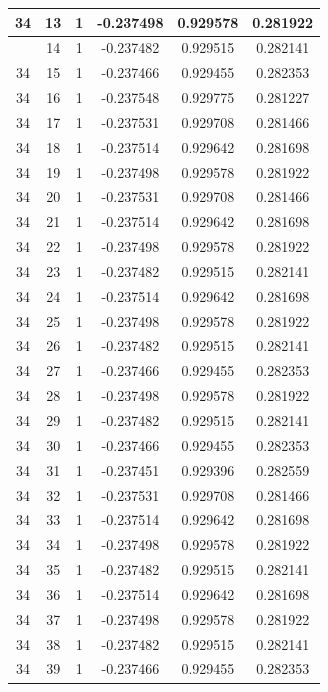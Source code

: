 \documentclass[12pt,a4paper]{article}
\numberwithin{equation}{section}
\numberwithin{figure}{section}
\numberwithin{table}{section}
\begin{document}
\begin{longtable}{|c|c|c|c|c|c|}
34 & 13 & 1 & -0.237498 & 0.929578 & 0.281922 \\ \hline
\pagebreak
34 & 14 & 1 & -0.237482 & 0.929515 & 0.282141 \\ \hline
34 & 15 & 1 & -0.237466 & 0.929455 & 0.282353 \\ \hline
34 & 16 & 1 & -0.237548 & 0.929775 & 0.281227 \\ \hline
34 & 17 & 1 & -0.237531 & 0.929708 & 0.281466 \\ \hline
34 & 18 & 1 & -0.237514 & 0.929642 & 0.281698 \\ \hline
34 & 19 & 1 & -0.237498 & 0.929578 & 0.281922 \\ \hline
34 & 20 & 1 & -0.237531 & 0.929708 & 0.281466 \\ \hline
34 & 21 & 1 & -0.237514 & 0.929642 & 0.281698 \\ \hline
34 & 22 & 1 & -0.237498 & 0.929578 & 0.281922 \\ \hline
34 & 23 & 1 & -0.237482 & 0.929515 & 0.282141 \\ \hline
34 & 24 & 1 & -0.237514 & 0.929642 & 0.281698 \\ \hline
34 & 25 & 1 & -0.237498 & 0.929578 & 0.281922 \\ \hline
34 & 26 & 1 & -0.237482 & 0.929515 & 0.282141 \\ \hline
34 & 27 & 1 & -0.237466 & 0.929455 & 0.282353 \\ \hline
34 & 28 & 1 & -0.237498 & 0.929578 & 0.281922 \\ \hline
34 & 29 & 1 & -0.237482 & 0.929515 & 0.282141 \\ \hline
34 & 30 & 1 & -0.237466 & 0.929455 & 0.282353 \\ \hline
34 & 31 & 1 & -0.237451 & 0.929396 & 0.282559 \\ \hline
34 & 32 & 1 & -0.237531 & 0.929708 & 0.281466 \\ \hline
34 & 33 & 1 & -0.237514 & 0.929642 & 0.281698 \\ \hline
34 & 34 & 1 & -0.237498 & 0.929578 & 0.281922 \\ \hline
34 & 35 & 1 & -0.237482 & 0.929515 & 0.282141 \\ \hline
34 & 36 & 1 & -0.237514 & 0.929642 & 0.281698 \\ \hline
34 & 37 & 1 & -0.237498 & 0.929578 & 0.281922 \\ \hline
34 & 38 & 1 & -0.237482 & 0.929515 & 0.282141 \\ \hline
34 & 39 & 1 & -0.237466 & 0.929455 & 0.282353 \\ \hline

\end{longtable}
\end{document}
